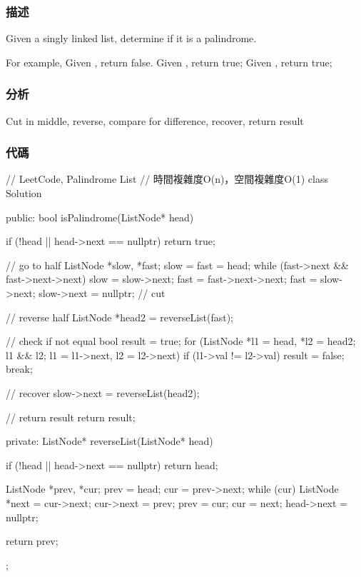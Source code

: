 \subsubsection{描述}
Given a singly linked list, determine if it is a palindrome.

For example,
Given , return false.
Given , return true;
Given , return true;


\subsubsection{分析}
Cut in middle, reverse, compare for difference, recover, return result

\subsubsection{代碼}
\begin{Code}
// LeetCode, Palindrome List
// 時間複雜度O(n)，空間複雜度O(1)
class Solution {
public:
    bool isPalindrome(ListNode* head) {
        if (!head || head->next == nullptr) return true;

        // go to half
        ListNode *slow, *fast; slow = fast = head;
        while (fast->next && fast->next->next) {
            slow = slow->next;
            fast = fast->next->next;
        }
        fast = slow->next;
        slow->next = nullptr; // cut

        // reverse half
        ListNode *head2 = reverseList(fast);

        // check if not equal
        bool result = true;
        for (ListNode *l1 = head, *l2 = head2;
            l1 && l2;
            l1 = l1->next, l2 = l2->next) {
            if (l1->val != l2->val) {
                result = false;
                break;
            }
        }

        // recover
        slow->next = reverseList(head2);

        // return result
        return result;
    }
private:
    ListNode* reverseList(ListNode* head) {
        if (!head || head->next == nullptr) return head;

        ListNode *prev, *cur;
        prev = head; cur = prev->next;
        while (cur) {
            ListNode *next = cur->next;
            cur->next = prev;
            prev = cur;
            cur = next;
        }
        head->next = nullptr;

        return prev;
    }
};
\end{Code}

